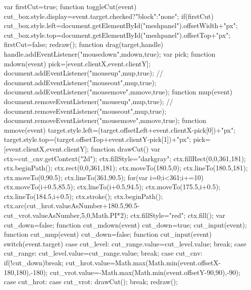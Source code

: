             var firstCut=true;
            function toggleCut(event){
                cut_box.style.display=event.target.checked?"block":"none";
                if(firstCut){
                    cut_box.style.left=document.getElementById("meshpanel").offsetWidth+"px";
                    cut_box.style.top=document.getElementById("meshpanel").offsetTop+"px";
                }
                firstCut=false;
                redraw();
            }
            function drag(target,handle){
                handle.addEventListener("mousedown",mdown,true);
                var pick;
                function mdown(event){
                    pick=[event.clientX,event.clientY];
                    document.addEventListener("mouseup",mup,true);
//                    document.addEventListener("mouseout",mup,true);
                    document.addEventListener("mousemove",mmove,true);
                }
                function mup(event){
                    document.removeEventListener("mouseup",mup,true);
//                    document.removeEventListener("mouseout",mup,true);
                    document.removeEventListener("mousemove",mmove,true);
                }
                function mmove(event){
                    target.style.left=(target.offsetLeft+event.clientX-pick[0])+"px";
                    target.style.top=(target.offsetTop+event.clientY-pick[1])+"px";
                    pick=[event.clientX,event.clientY];
                }
            }
            function drawCut(){
                var ctx=cut_cnv.getContext("2d");
                ctx.fillStyle="darkgray";
                ctx.fillRect(0,0,361,181);
                ctx.beginPath();
                ctx.rect(0,0,361,181);
                ctx.moveTo(180.5,0);
                ctx.lineTo(180.5,181);
                ctx.moveTo(0,90.5);
                ctx.lineTo(361,90.5);
                for(var i=0;i<361;i+=10){
                    ctx.moveTo(i+0.5,85.5);
                    ctx.lineTo(i+0.5,94.5);
                    ctx.moveTo(175.5,i+0.5);
                    ctx.lineTo(184.5,i+0.5);
                }
                ctx.stroke();
                ctx.beginPath();
                ctx.arc(cut_hrot.valueAsNumber+180.5,90.5-cut_vrot.valueAsNumber,5,0,Math.PI*2);
                ctx.fillStyle="red";
                ctx.fill();
            }
            var cut_down=false;
            function cut_mdown(event){
                cut_down=true;
                cut_input(event);
            }
            function cut_mup(event){
                cut_down=false;
            }
            function cut_input(event){
                switch(event.target){
                    case cut_level:
                        cut_range.value=cut_level.value;
                        break;
                    case cut_range:
                        cut_level.value=cut_range.value;
                        break;
                    case cut_cnv:
                        if(!cut_down)break;
                        cut_hrot.value=Math.max(Math.min(event.offsetX-180,180),-180);
                        cut_vrot.value=-Math.max(Math.min(event.offsetY-90,90),-90);
                    case cut_hrot:
                    case cut_vrot:
                        drawCut();
                        break;
                }
                redraw();
            }
